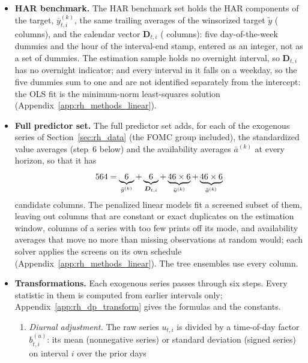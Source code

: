 \begin{itemize}
  $\mathrm{OFI}^{\mathrm{EW}}$ and $\mathrm{Spread}^{\mathrm{VW}}$), denote the announcement predictors by
  $\mathrm{FOMC}$, and write $\bar a^{(k)}(u)$ for the availability average of series $u$.
  \fi
\item \textbf{HAR benchmark.} The HAR benchmark set holds the HAR components of the target, $\bar y^{(k)}_{t,i}$, the
  same trailing averages of the winsorized target $\tilde y$ (\rhdmNHorizonsPooled{} columns), and the calendar vector
  $\bm D_{t,i}$ (\rhorNCalendarAf{} columns): five day-of-the-week dummies and the hour of the interval-end stamp,
  entered as an integer, not as a set of dummies. The estimation sample holds no overnight interval, so
  $\bm D_{t,i}$ has no overnight indicator; and every interval in it falls on a weekday, so the five dummies sum to one
  and are not identified separately from the intercept: the OLS fit is the minimum-norm least-squares solution
  (Appendix~\ref{app:rh_methods_linear}).
\item \textbf{Full predictor set.} The full predictor set adds, for each of the \rhdmNSeriesPooled{} exogenous series
  of Section~\ref{sec:rh_data} (the FOMC group included), the standardized value averages (step~6 below) and the
  availability averages $\bar a^{(k)}$ at every horizon, so that it has
  \[
    564 = \underbrace{6}_{\bar y^{(k)}}
      + \underbrace{6}_{\bm D_{t,i}}
      + \underbrace{46 \times 6}_{\bar u^{(k)}}
      + \underbrace{46 \times 6}_{\bar a^{(k)}}
  \]
  candidate columns. The penalized linear models fit a screened subset of them, leaving out columns that are
  constant or exact duplicates on the estimation window, columns of a series with too few prints off its mode, and
  availability averages that move no more than missing observations at random would; each solver applies the
  screens on its own schedule (Appendix~\ref{app:rh_methods_linear}). The tree ensembles use every column.
\item \textbf{Transformations.} Each exogenous series passes through six steps. Every statistic in them is computed
  from earlier intervals only; Appendix~\ref{app:rh_dp_transform} gives the formulas and the constants.
  \begin{enumerate}
  \item \emph{Diurnal adjustment.} The raw series $u_{t,i}$ is divided by a time-of-day factor $b^{(u)}_{t,i}$: its
    mean (nonnegative series) or standard deviation (signed series) on interval $i$ over the prior days

\end{enumerate}
\end{itemize}

